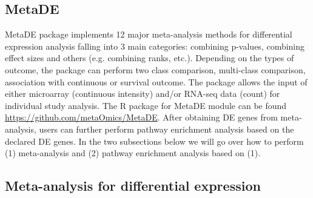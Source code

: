\subsection{MetaDE}

MetaDE package implements 12 major meta-analysis methods for differential expression analysis falling into 3 main categories: combining p-values, combining effect sizes and others (e.g. combining ranks, etc.). Depending on the types of outcome, the package can perform two class comparison, multi-class comparison, association with continuous or survival outcome. The package allows the input of either microarray (continuous intensity) and/or RNA-seq data (count) for individual study analysis. 
The R package for MetaDE module can be found \url{https://github.com/metaOmics/MetaDE}.
After obtaining DE genes from meta-analysis, 
users can further perform pathway enrichment analysis based on the declared DE genes.
In the two subsections below we will go over how to perform (1) meta-analysis and (2) pathway enrichment analysis based on (1).


\subsection{Meta-analysis for differential expression}

